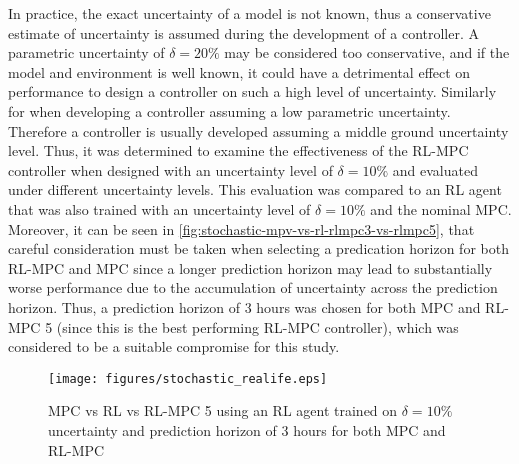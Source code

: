 In practice, the exact uncertainty of a model is not known, thus a conservative estimate of uncertainty is assumed during the development of a controller. A parametric uncertainty of $\delta = 20\%$ may be considered too conservative, and if the model and environment is well known, it could have a detrimental effect on performance to design a controller on such a high level of uncertainty. Similarly for when developing a controller assuming a low parametric uncertainty. Therefore a controller is usually developed assuming a middle ground uncertainty level. Thus, it was determined to examine the effectiveness of the RL-MPC controller when designed with an uncertainty level of $\delta = 10\%$ and evaluated under different uncertainty levels. This evaluation was compared to an RL agent that was also trained with an uncertainty level of $\delta = 10\%$ and the nominal MPC. Moreover, it can be seen in \autoref{fig:stochastic-mpv-vs-rl-rlmpc3-vs-rlmpc5}, that careful consideration must be taken when selecting a predication horizon for both RL-MPC and MPC since a longer prediction horizon may lead to substantially worse performance due to the accumulation of uncertainty across the prediction horizon. Thus, a prediction horizon of 3 hours was chosen for both  MPC and RL-MPC 5 (since this is the best performing RL-MPC controller), which was considered to be a suitable compromise for this study.



\begin{figure}[H]
	\centering
	\texttt{[image: figures/stochastic\_realife.eps]}
	\caption{MPC vs RL vs RL-MPC 5 using an RL agent trained on $\delta = 10\%$ uncertainty and prediction horizon of 3 hours for both MPC and RL-MPC}
	\label{fig:stochastic-reallife}
\end{figure}

